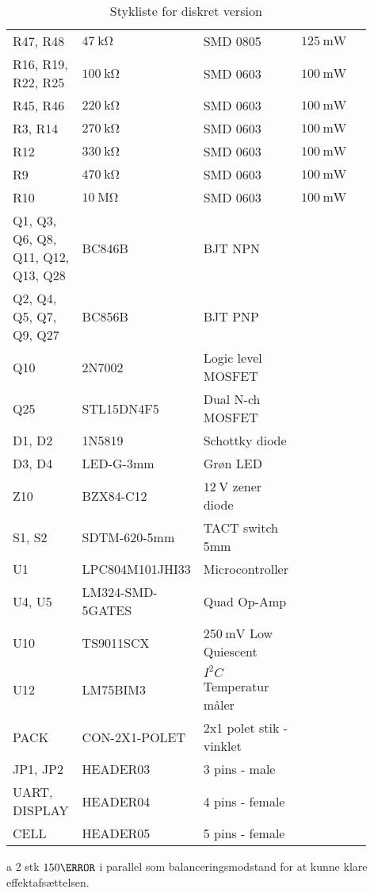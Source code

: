 \begin{table}[h!]
\begin{threeparttable}
\begin{tabular}{p{0.25\linewidth}p{0.2\linewidth}p{0.25\linewidth}p{0.15\linewidth}p{0.05\linewidth}}
R47, R48 & $\SI{47}{\kilo\ohm}$ & SMD 0805 & $\SI{125}{\milli\watt}$  \\
R16, R19, R22, R25 & $\SI{100}{\kilo\ohm}$ & SMD 0603 & $\SI{100}{\milli\watt}$  \\
R45, R46 & $\SI{220}{\kilo\ohm}$ & SMD 0603 & $\SI{100}{\milli\watt}$  \\
R3, R14 & $\SI{270}{\kilo\ohm}$ & SMD 0603 & $\SI{100}{\milli\watt}$  \\
R12 & $\SI{330}{\kilo\ohm}$ & SMD 0603 & $\SI{100}{\milli\watt}$  \\
R9 & $\SI{470}{\kilo\ohm}$ & SMD 0603 & $\SI{100}{\milli\watt}$  \\
R10 & $\SI{10}{\mega\ohm}$ & SMD 0603 & $\SI{100}{\milli\watt}$  \\
\midrule

Q1, Q3, Q6, Q8, Q11, Q12, Q13, Q28 & BC846B & BJT NPN &   \\
Q2, Q4, Q5, Q7, Q9, Q27 & BC856B & BJT PNP &   \\
Q10 & 2N7002 & Logic level MOSFET &   \\
Q25 & STL15DN4F5 & Dual N-ch MOSFET &   \\

\midrule
D1, D2 & 1N5819 & Schottky diode &   \\
D3, D4 & LED-G-3mm  & Grøn LED &   \\
Z10 & BZX84-C12 & $\SI{12}{\volt}$ zener diode&   \\
S1, S2 & SDTM-620-5mm  & TACT switch 5mm &   \\
U1 & LPC804M101JHI33 & Microcontroller &   \\
U4, U5 & LM324-SMD-5GATES & Quad Op-Amp &   \\
U10 & TS9011SCX & $\SI{250}{\milli\volt}$ Low Quiescent &   \\
U12 & LM75BIM3 & $I^{2}C$ Temperatur måler &   \\
PACK & CON-2X1-POLET & 2x1 polet stik - vinklet &   \\
JP1, JP2 & HEADER03 & 3 pins - male &   \\
UART, DISPLAY & HEADER04 & 4 pins - female &   \\
CELL & HEADER05 & 5 pins - female &   \\

\hline
\bottomrule
\end{tabular}
\begin{tablenotes}
\item[a] 2 stk $150\ohm$ i parallel som balanceringsmodstand for at kunne klare effektafsættelsen.
\end{tablenotes}
\end{threeparttable}
\caption{Stykliste for diskret version}
\end{table} 
